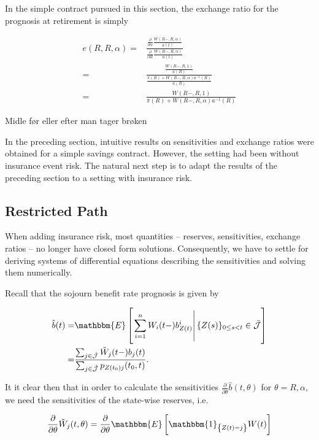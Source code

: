 \documentclass{article}
\newcommand{\1}[1]{\mathbbm{1}_{\left\lbrace #1 \right\rbrace}}
\newcommand{\expec}[1][def]{\mathbbm{E} \left[ #1 \right]}
\newcommand{\econd}[2][def]{\mathbbm{E} \left[ \left. #1 \right| #2 \right]}
\theoremstyle{break}
\theoremstyle{remark}
\newenvironment{remark}
  {\pushQED{\qed}\renewcommand{\qedsymbol}{\scalebox{1.4}{$\circ$}}\remarkx}
  {\popQED\endremarkx}
\numberwithin{equation}{section}
\begin{document}
In the simple contract pursued in this section, the exchange ratio for the prognosis at retirement is simply

\begin{align*}
	e(R,R,\alpha) =& \frac{\frac{\partial}{\partial \alpha }\frac{W(R-,R,\alpha)}{a(t)}}{\frac{\partial}{\partial R }\frac{W(R-,R,\alpha)}{a(t)}} \\
	=& \frac{\frac{W(R-,R,1)}{a(R)}}{\frac{\pi (R) + W(R-,R,\alpha) a^{-1}(R)}{a(R)}} \\
	=& \frac{W(R-,R,1)}{\pi (R) + W(R-,R,\alpha) a^{-1}(R)}
\end{align*}



\begin{remark}
	Midle før eller efter man tager brøken
\end{remark}

In the preceding section, intuitive results on sensitivities and exchange ratios were obtained for a simple savings contract. However, the setting had been without insurance event risk. The natural next step is to adapt the results of the preceding section to a setting with insurance risk.

\subsection{Restricted Path}

When adding insurance risk, most quantities -- reserves, sensitivities, exchange ratios -- no longer have closed form solutions. Consequently, we have to settle for deriving systems of differential equations describing the sensitivities and solving them numerically.

Recall that the sojourn benefit rate prognosis is given by

\begin{align*}
	\hat{b}(t)=& \econd[\sum_{i=1}^n W_i(t-)b_{Z(t)}^i]{\{Z(s) \}_{0 \leq s < t} \in \bar{\mathcal{J}}} \\
	=& \frac{\sum_{j \in \hat{\mathcal{J}}} \tilde{W}_j(t-) b_j(t)}{\sum_{j \in \hat{\mathcal{J}}} p_{Z(t_0)j}(t_0,t)}.
\end{align*}

It it clear then that in order to calculate the sensitivities $\frac{\partial}{\partial \theta} \hat{b}(t,\theta)$ for $\theta=R,\alpha$, we need the sensitivities of the state-wise reserves, i.e.

\begin{align*}
	\frac{\partial}{\partial \theta} \tilde{W}_j(t,\theta) = \frac{\partial}{\partial \theta} \expec[\1{Z(t)=j} W(t)]
\end{align*}
\end{document}
